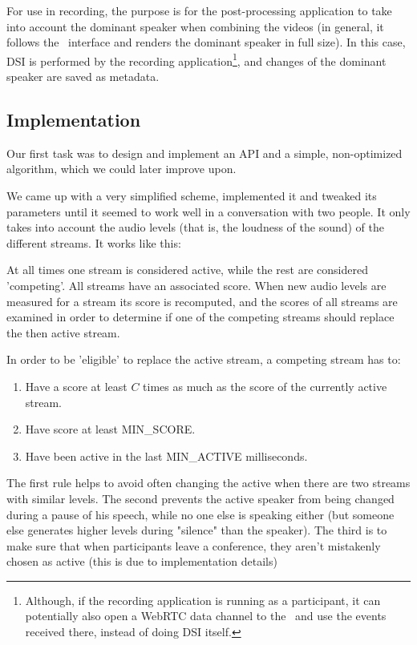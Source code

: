 \documentclass[twoside,openright,a4paper,12pt,english]{article}
\begin{document}
For use in recording, the purpose is for the post-processing application to
take into account the dominant speaker when combining the videos (in general,
it follows the \jm\ interface and renders the dominant speaker in full size).
In this case, DSI is performed by the recording application\footnote{Although,
if the recording application is running as a participant, it can potentially
also open a WebRTC data channel to the \jvb\ and use the events received there,
instead of doing DSI itself.}, and changes of
the dominant speaker are saved as metadata.

\subsection{Implementation}
Our first task was to design and implement an API and a simple, non-optimized
algorithm, which we could later improve upon. 

We came up with a very simplified scheme, implemented it and tweaked its parameters until it seemed to
work well in a conversation with two people. It only takes into account the
audio levels (that is, the loudness of the sound) of the different streams. It
works like this:

At all times one stream is considered active, while the rest are considered
'competing'. All streams have an associated score. When new audio levels are
measured for a stream its score is recomputed,
and the scores of all streams are examined in order to determine if one of
the competing streams should replace the then active stream.

In order to be 'eligible' to replace the active stream, a competing stream has to:
\begin{enumerate}
    \item Have a score at least $C$ times as much as the score of the currently active stream.
    \item Have score at least MIN\_SCORE.
    \item Have been active in the last MIN\_ACTIVE milliseconds.
\end{enumerate}

The first rule helps to avoid often changing the active when there are two
streams with similar levels. The second prevents the active speaker from being
changed during a pause of his speech, while no one else is speaking either (but
someone else generates higher levels during "silence" than the speaker). The
third is to make sure that when participants leave a conference, they aren't
mistakenly chosen as active (this is due to implementation details)
\end{document}
